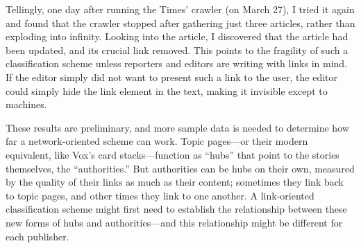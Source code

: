 Tellingly, one day after running the Times' crawler (on March 27), I tried it again and found that the crawler stopped after gathering just three articles, rather than exploding into infinity. Looking into the article, I discovered that the article had been updated, and its crucial link removed. This points to the fragility of such a classification scheme unless reporters and editors are writing with links in mind. If the editor simply did not want to present such a link to the user, the editor could simply hide the link element in the text, making it invisible except to machines.

These results are preliminary, and more sample data is needed to determine how far a network-oriented scheme can work. Topic pages---or their modern equivalent, like Vox's card stacks---function as ``hubs'' that point to the stories themselves, the ``authorities.'' But authorities can be hubs on their own, measured by the quality of their links as much as their content; sometimes they link back to topic pages, and other times they link to one another. A link-oriented classification scheme might first need to establish the relationship between these new forms of hubs and authorities---and this relationship might be different for each publisher.











